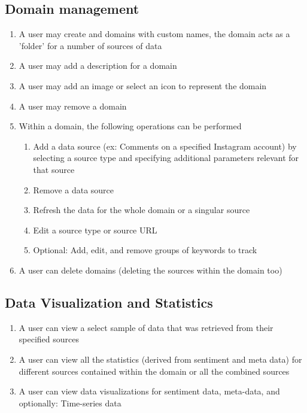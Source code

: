 \documentclass[12pt]{article}
\begin{document}
\subsection{Domain management}
\begin{enumerate}
  \item A user may create and domains with custom names, the domain acts as a 'folder' for a number of sources of data
  \item A user may add a description for a domain
  \item A user may add an image or select an icon to represent the domain
  \item A user may remove a domain
  \item Within a domain, the following operations can be performed
        \begin{enumerate}
          \item Add a data source (ex: Comments on a specified Instagram account) by selecting a source type and specifying additional parameters relevant for that source
          \item Remove a data source
          \item Refresh the data for the whole domain or a singular source
          \item Edit a source type or source URL
          \item Optional: Add, edit, and remove groups of keywords to track
        \end{enumerate}
  \item A user can delete domains (deleting the sources within the domain too)
\end{enumerate}

\subsection{Data Visualization and Statistics}
\begin{enumerate}
  \item A user can view a select sample of data that was retrieved from their specified sources
  \item A user can view all the statistics (derived from sentiment and meta data) for different sources contained within the domain or all the combined sources
  \item A user can view data visualizations for sentiment data, meta-data, and optionally: Time-series data
\end{enumerate}
\end{document}
